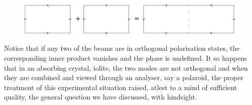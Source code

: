 \begin{figure}[H]
\centering
\includegraphics[scale=0.18]{src/images/chap26/13.jpg}
\end{figure}
\bigskip

Notice that if any two of the beams are in orthogonal polarisation states, the
corresponding inner product vanishes and the phase is undefined. It so happens
that in an absorbing crystal, iolite, the two modes are not orthogonal and when
they are combined and viewed through an analyser, say a polaroid, the proper
treatment of this experimental situation raised, atlest to a mind of sufficient
quality, the general question we have discussed, with hindsight.

